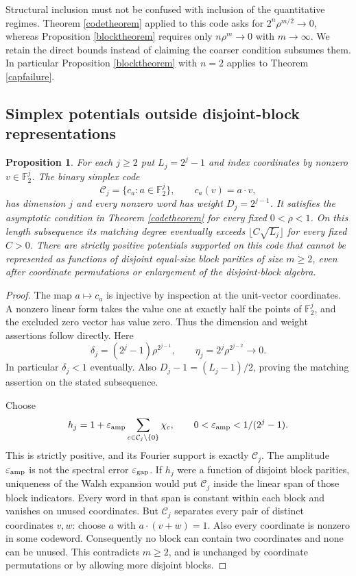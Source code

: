 \documentclass[11pt]{article}
\newcommand{\F}{\mathbb F}
\newtheorem{proposition}[theorem]{Proposition}
\begin{document}
Structural inclusion must not be confused with inclusion of the quantitative regimes. Theorem \ref{codetheorem} applied to this code asks for $2^n\rho^{m/2}\to0$, whereas Proposition \ref{blocktheorem} requires only $n\rho^m\to0$ with $m\to\infty$. We retain the direct bounds instead of claiming the coarser condition subsumes them. In particular Proposition \ref{blocktheorem} with $n=2$ applies to Theorem \ref{capfailure}.

\subsection{Simplex potentials outside disjoint-block representations}
\begin{proposition}\label{simplex}
For each $j\geq2$ put $L_j=2^j-1$ and index coordinates by nonzero $v\in\F_2^j$. The binary simplex code
\[
 \mathcal C_j=\{c_a:a\in\F_2^j\},\qquad c_a(v)=a\cdot v,
\]
has dimension $j$ and every nonzero word has weight $D_j=2^{j-1}$. It satisfies the asymptotic condition in Theorem \ref{codetheorem} for every fixed $0<\rho<1$. On this length subsequence its matching degree eventually exceeds $\lfloor C\sqrt{L_j}\rfloor$ for every fixed $C>0$.
There are strictly positive potentials supported on this code that cannot be represented as functions of disjoint equal-size block parities of size $m\geq2$, even after coordinate permutations or enlargement of the disjoint-block algebra.
\end{proposition}
\begin{proof}
The map $a\mapsto c_a$ is injective by inspection at the unit-vector coordinates. A nonzero linear form takes the value one at exactly half the points of $\F_2^j$, and the excluded zero vector has value zero. Thus the dimension and weight assertions follow directly. Here
\[
 \delta_j=(2^j-1)\rho^{2^{j-1}},\qquad
 \eta_j=2^j\rho^{2^{j-2}}\longrightarrow0.
\]
In particular $\delta_j<1$ eventually. Also $D_j-1=(L_j-1)/2$, proving the matching assertion on the stated subsequence.

Choose
\[
 h_j=1+\varepsilon_{\rm amp}\sum_{c\in\mathcal C_j\setminus\{0\}}\chi_c,
 \qquad 0<\varepsilon_{\rm amp}<1/(2^j-1).
\]
This is strictly positive, and its Fourier support is exactly $\mathcal C_j$. The amplitude $\varepsilon_{\rm amp}$ is not the spectral error $\varepsilon_{\rm gap}$.
If $h_j$ were a function of disjoint block parities, uniqueness of the Walsh expansion would put $\mathcal C_j$ inside the linear span of those block indicators. Every word in that span is constant within each block and vanishes on unused coordinates. But $\mathcal C_j$ separates every pair of distinct coordinates $v,w$: choose $a$ with $a\cdot(v+w)=1$. Also every coordinate is nonzero in some codeword. Consequently no block can contain two coordinates and none can be unused. This contradicts $m\geq2$, and is unchanged by coordinate permutations or by allowing more disjoint blocks.
\end{proof}
\end{document}
